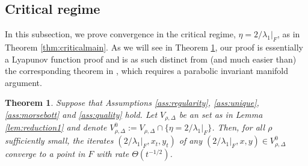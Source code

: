 \documentclass{article}
\theoremstyle{plain}
\newtheorem{theorem}{Theorem}[section]
\theoremstyle{definition}
\theoremstyle{remark}
\begin{document}
\subsection{Critical regime}\label{subsec:criticalappendix}

In this subsection, we prove convergence in the critical regime, $\eta=2/\lambda_1|_F$, as in Theorem \ref{thm:criticalmain}. As we will see in Theorem \ref{thm:criticalappendix}, our proof is essentially a Lyapunov function proof and is as such distinct from (and much easier than) the corresponding theorem in \cite{macdonaldeos}, which requires a parabolic invariant manifold argument.

\begin{theorem}\label{thm:criticalappendix}
    Suppose that Assumptions \ref{ass:regularity}, \ref{ass:unique}, \ref{ass:morsebott} and \ref{ass:quality} hold. 
    Let $V_{\rho,\Delta}$ be an set as in Lemma \ref{lem:reduction1} and denote $V^0_{\rho,\Delta}:=V_{\rho,\Delta}\cap\{\eta = 2/\lambda_1|_F\}$. Then, for all $\rho$ sufficiently small, the iterates $(2/\lambda_1|_F,x_t,y_t)$ of any $(2/\lambda_1|_F,x,y)\in V^0_{\rho,\Delta}$ converge to a point in $F$ with rate $\Theta(t^{-1/2})$.
\end{theorem}
\end{document}
